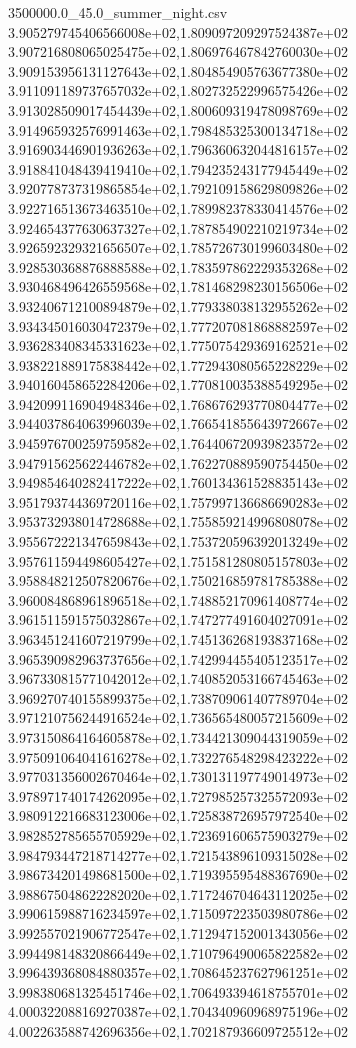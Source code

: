 \begin{filecontents*}{3500000.0_45.0_summer_night.csv}
3.905279745406566008e+02,1.809097209297524387e+02
3.907216808065025475e+02,1.806976467842760030e+02
3.909153956131127643e+02,1.804854905763677380e+02
3.911091189737657032e+02,1.802732522996575426e+02
3.913028509017454439e+02,1.800609319478098769e+02
3.914965932576991463e+02,1.798485325300134718e+02
3.916903446901936263e+02,1.796360632044816157e+02
3.918841048439419410e+02,1.794235243177945449e+02
3.920778737319865854e+02,1.792109158629809826e+02
3.922716513673463510e+02,1.789982378330414576e+02
3.924654377630637327e+02,1.787854902210219734e+02
3.926592329321656507e+02,1.785726730199603480e+02
3.928530368876888588e+02,1.783597862229353268e+02
3.930468496426559568e+02,1.781468298230156506e+02
3.932406712100894879e+02,1.779338038132955262e+02
3.934345016030472379e+02,1.777207081868882597e+02
3.936283408345331623e+02,1.775075429369162521e+02
3.938221889175838442e+02,1.772943080565228229e+02
3.940160458652284206e+02,1.770810035388549295e+02
3.942099116904948346e+02,1.768676293770804477e+02
3.944037864063996039e+02,1.766541855643972667e+02
3.945976700259759582e+02,1.764406720939823572e+02
3.947915625622446782e+02,1.762270889590754450e+02
3.949854640282417222e+02,1.760134361528835143e+02
3.951793744369720116e+02,1.757997136686690283e+02
3.953732938014728688e+02,1.755859214996808078e+02
3.955672221347659843e+02,1.753720596392013249e+02
3.957611594498605427e+02,1.751581280805157803e+02
3.958848212507820676e+02,1.750216859781785388e+02
3.960084868961896518e+02,1.748852170961408774e+02
3.961511591575032867e+02,1.747277491604027091e+02
3.963451241607219799e+02,1.745136268193837168e+02
3.965390982963737656e+02,1.742994455405123517e+02
3.967330815771042012e+02,1.740852053166745463e+02
3.969270740155899375e+02,1.738709061407789704e+02
3.971210756244916524e+02,1.736565480057215609e+02
3.973150864164605878e+02,1.734421309044319059e+02
3.975091064041616278e+02,1.732276548298423222e+02
3.977031356002670464e+02,1.730131197749014973e+02
3.978971740174262095e+02,1.727985257325572093e+02
3.980912216683123006e+02,1.725838726957972540e+02
3.982852785655705929e+02,1.723691606575903279e+02
3.984793447218714277e+02,1.721543896109315028e+02
3.986734201498681500e+02,1.719395595488367690e+02
3.988675048622282020e+02,1.717246704643112025e+02
3.990615988716234597e+02,1.715097223503980786e+02
3.992557021906772547e+02,1.712947152001343056e+02
3.994498148320866449e+02,1.710796490065822582e+02
3.996439368084880357e+02,1.708645237627961251e+02
3.998380681325451746e+02,1.706493394618755701e+02
4.000322088169270387e+02,1.704340960968975196e+02
4.002263588742696356e+02,1.702187936609725512e+02

\end{filecontents*}
